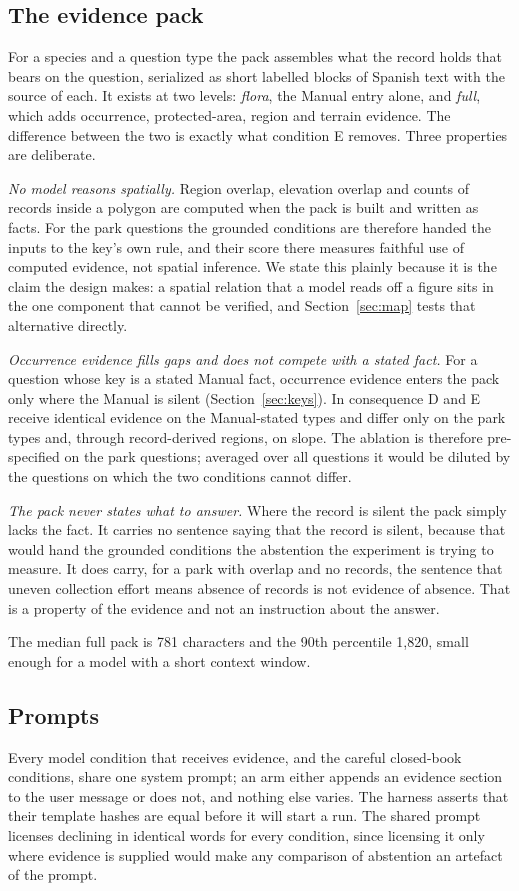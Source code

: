 \documentclass[11pt,a4paper]{article}
\begin{document}
\subsection{The evidence pack}
For a species and a question type the pack assembles what the record holds that bears
on the question, serialized as short labelled blocks of Spanish text with the source
of each. It exists at two levels: \emph{flora}, the Manual entry alone, and
\emph{full}, which adds occurrence, protected-area, region and terrain evidence. The
difference between the two is exactly what condition E removes. Three properties are
deliberate.

\emph{No model reasons spatially.} Region overlap, elevation overlap and counts of
records inside a polygon are computed when the pack is built and written as facts.
For the park questions the grounded conditions are therefore handed the inputs to
the key's own rule, and their score there measures faithful use of computed evidence,
not spatial inference. We state this plainly because it is the claim the design
makes: a spatial relation that a model reads off a figure sits in the one component
that cannot be verified, and Section~\ref{sec:map} tests that alternative directly.

\emph{Occurrence evidence fills gaps and does not compete with a stated fact.} For a
question whose key is a stated Manual fact, occurrence evidence enters the pack only
where the Manual is silent (Section~\ref{sec:keys}). In consequence D and E receive
identical evidence on the Manual-stated types and differ only on the park types and,
through record-derived regions, on slope. The ablation is therefore pre-specified on
the park questions; averaged over all questions it would be diluted by the questions
on which the two conditions cannot differ.

\emph{The pack never states what to answer.} Where the record is silent the pack
simply lacks the fact. It carries no sentence saying that the record is silent,
because that would hand the grounded conditions the abstention the experiment is
trying to measure. It does carry, for a park with overlap and no records, the
sentence that uneven collection effort means absence of records is not evidence of
absence. That is a property of the evidence and not an instruction about the answer.

The median full pack is 781 characters and the 90th percentile 1{,}820, small enough
for a model with a short context window.

\subsection{Prompts}\label{sec:prompts}
Every model condition that receives evidence, and the careful closed-book conditions,
share one system prompt; an arm either appends an evidence section to the user
message or does not, and nothing else varies. The harness asserts that their template
hashes are equal before it will start a run. The shared prompt licenses declining in
identical words for every condition, since licensing it only where evidence is
supplied would make any comparison of abstention an artefact of the prompt.
\end{document}

